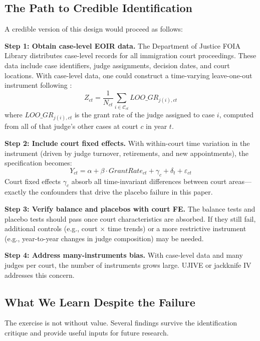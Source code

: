 \documentclass[12pt]{article}
\begin{document}
\subsection{The Path to Credible Identification}

A credible version of this design would proceed as follows:

\textbf{Step 1: Obtain case-level EOIR data.} The Department of Justice FOIA Library distributes case-level records for all immigration court proceedings. These data include case identifiers, judge assignments, decision dates, and court locations. With case-level data, one could construct a time-varying leave-one-out instrument following \citet{kolesar2013estimation}:
\begin{equation}
Z_{ct} = \frac{1}{N_{ct}} \sum_{i \in \mathcal{C}_{ct}} LOO\_GR_{j(i),ct}
\end{equation}
where $LOO\_GR_{j(i),ct}$ is the grant rate of the judge assigned to case $i$, computed from all of that judge's other cases at court $c$ in year $t$.

\textbf{Step 2: Include court fixed effects.} With within-court time variation in the instrument (driven by judge turnover, retirements, and new appointments), the specification becomes:
\begin{equation}
Y_{ct} = \alpha + \beta \cdot GrantRate_{ct} + \gamma_c + \delta_t + \varepsilon_{ct}
\end{equation}
Court fixed effects $\gamma_c$ absorb all time-invariant differences between court areas---exactly the confounders that drive the placebo failure in this paper.

\textbf{Step 3: Verify balance and placebos with court FE.} The balance tests and placebo tests should pass once court characteristics are absorbed. If they still fail, additional controls (e.g., court $\times$ time trends) or a more restrictive instrument (e.g., year-to-year changes in judge composition) may be needed.

\textbf{Step 4: Address many-instruments bias.} With case-level data and many judges per court, the number of instruments grows large. UJIVE \citep{kolesar2013estimation} or jackknife IV addresses this concern.

\subsection{What We Learn Despite the Failure}

The exercise is not without value. Several findings survive the identification critique and provide useful inputs for future research.
\end{document}
